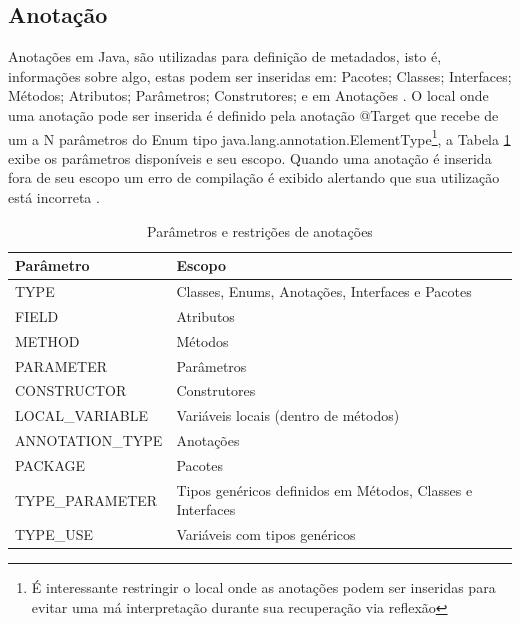 \subsection{Anotação}

\par Anotações em Java, são utilizadas para definição de metadados, isto é, informações sobre algo, estas podem ser inseridas em: Pacotes; Classes; Interfaces; Métodos; Atributos; Parâmetros; Construtores; e em Anotações \cite{jcp2005annotation269}. O local onde uma anotação pode ser inserida é definido pela anotação @Target que recebe de um a N parâmetros do Enum tipo java.lang.annotation.ElementType\footnote{É interessante restringir o local onde as anotações podem ser inseridas para evitar uma má interpretação durante sua recuperação via reflexão}, a Tabela \ref{tab:targets} exibe os parâmetros disponíveis e seu escopo. Quando uma anotação é inserida fora de seu escopo um erro de compilação é exibido alertando que sua utilização está incorreta .

\begin{table}[H]
    \centering
    \caption{Parâmetros e restrições de anotações}
    \begin{tabular}{|l|l|}
        \hline
        Parâmetro & Escopo \\ \hline
        TYPE & Classes, Enums, Anotações, Interfaces e  Pacotes \\ \hline
        FIELD & Atributos \\ \hline
        METHOD & Métodos \\ \hline
        PARAMETER & Parâmetros \\ \hline
        CONSTRUCTOR & Construtores \\ \hline
        LOCAL\_VARIABLE & Variáveis locais (dentro de métodos) \\ \hline ANNOTATION\_TYPE & Anotações \\ \hline
        PACKAGE & Pacotes \\ \hline
        TYPE\_PARAMETER  & Tipos genéricos definidos em Métodos, Classes e Interfaces \\ \hline
        TYPE\_USE & Variáveis com tipos genéricos \\ \hline
\end{tabular}
    \label{tab:targets}
\end{table}

